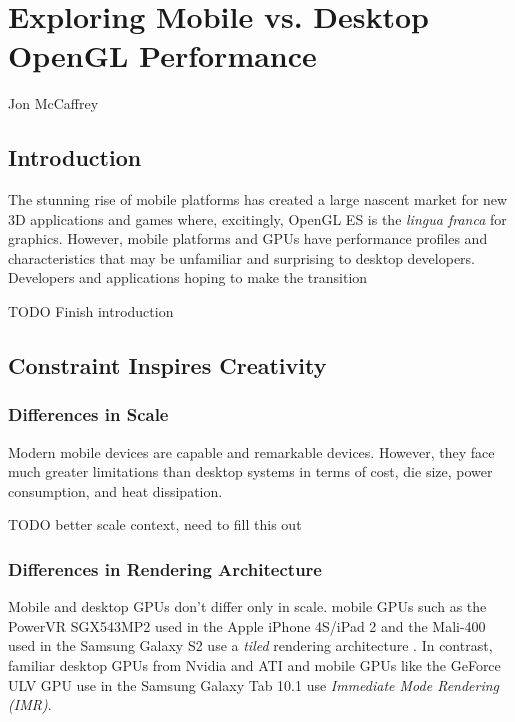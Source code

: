\chapter{Exploring Mobile vs. Desktop OpenGL Performance}{Jon McCaffrey}
 \label{Exploring-Mobile-vs-Desktop-OpenGL-Performance}

\section{Introduction}

The stunning rise of mobile platforms has created a large nascent market for new 3D applications and games where, excitingly, OpenGL ES is the \textit{lingua franca} for graphics. However, mobile platforms and GPUs have performance profiles and characteristics that may be unfamiliar and surprising to desktop developers.  Developers and applications hoping to make the transition

 TODO Finish introduction

\section{Constraint Inspires Creativity}\label{Jon-McCaffrey:Constraints-Inspire-Creativity}

\subsection{Differences in Scale}\label{Jon-McCaffrey:Architectural-Differences}
Modern mobile devices are capable and remarkable devices.  However, they face much greater limitations than desktop systems in terms of cost, die size, power consumption, and heat dissipation.

 TODO better scale context, need to fill this out

\subsection{Differences in Rendering Architecture}\label{Jon-McCaffrey:differences-in-rendering-architecture}
Mobile and desktop GPUs don't differ only in scale.  mobile GPUs such as the PowerVR SGX543MP2 used in the Apple iPhone 4S/iPad 2 and the Mali-400 used in the Samsung Galaxy S2 use a \textit{tiled} rendering architecture \cite{anandtech_galaxys2}.  In contrast, familiar desktop GPUs from Nvidia and ATI and mobile GPUs like the GeForce ULV GPU use in the Samsung Galaxy Tab 10.1 use \textit{Immediate Mode Rendering (IMR)}.

